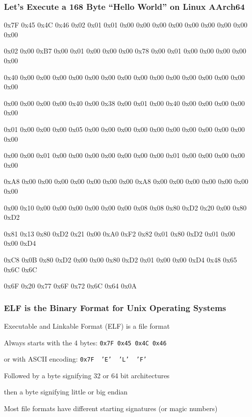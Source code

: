   \begin{frame}
    \frametitle{Let's Execute a 168 Byte ``Hello World'' on Linux AArch64}

    \scriptsize \ttfamily
    0x7F 0x45 0x4C 0x46 0x02 0x01 0x01 0x00 0x00 0x00 0x00 0x00 0x00 0x00 0x00
    0x00
    
    0x02 0x00 0xB7 0x00 0x01 0x00 0x00 0x00 0x78 0x00 0x01 0x00 0x00 0x00 0x00
    0x00
    
    0x40 0x00 0x00 0x00 0x00 0x00 0x00 0x00 0x00 0x00 0x00 0x00 0x00 0x00 0x00
    0x00
    
    0x00 0x00 0x00 0x00 0x40 0x00 0x38 0x00 0x01 0x00 0x40 0x00 0x00 0x00 0x00
    0x00
    
    0x01 0x00 0x00 0x00 0x05 0x00 0x00 0x00 0x00 0x00 0x00 0x00 0x00 0x00 0x00
    0x00
    
    0x00 0x00 0x01 0x00 0x00 0x00 0x00 0x00 0x00 0x00 0x01 0x00 0x00 0x00 0x00
    0x00
    
    0xA8 0x00 0x00 0x00 0x00 0x00 0x00 0x00 0xA8 0x00 0x00 0x00 0x00 0x00 0x00
    0x00
    
    0x00 0x10 0x00 0x00 0x00 0x00 0x00 0x00 0x08 0x08 0x80 0xD2 0x20 0x00 0x80
    0xD2
    
    0x81 0x13 0x80 0xD2 0x21 0x00 0xA0 0xF2 0x82 0x01 0x80 0xD2 0x01 0x00 0x00
    0xD4
    
    0xC8 0x0B 0x80 0xD2 0x00 0x00 0x80 0xD2 0x01 0x00 0x00 0xD4 0x48 0x65 0x6C
    0x6C
    
    0x6F 0x20 0x77 0x6F 0x72 0x6C 0x64 0x0A
  \end{frame}

  \begin{frame}
    \frametitle{ELF is the Binary Format for Unix Operating Systems}

    Executable and Linkable Format (ELF) is a file format

    \vspace{2em}

    Always starts with the 4 bytes: \hspace{0.5em} \texttt{0x7F 0x45 0x4C 0x46}

    \hspace{3em} or with ASCII encoding: \hspace{0.5em}
    \texttt{0x7F~~'E'~~'L'~~'F'}

    \vspace{2em}

    Followed by a byte signifying 32 or 64 bit architectures

    \hspace{2em} then a byte signifying little or big endian

    \vspace{4em}

    Most file formats have different starting signatures (or magic numbers)
  \end{frame}

